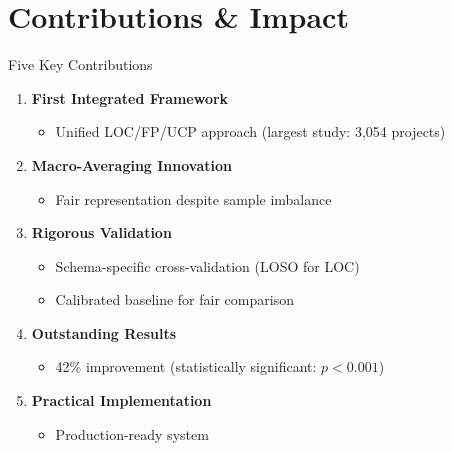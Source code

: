 \documentclass[aspectratio=169]{beamer}
\begin{document}
\section{Contributions \& Impact}

\begin{frame}{Five Key Contributions}
\begin{enumerate}
    \item \textbf{First Integrated Framework}
    \begin{itemize}
        \item Unified LOC/FP/UCP approach (largest study: 3,054 projects)
    \end{itemize}
    
    \vspace{0.2cm}
    \item \textbf{Macro-Averaging Innovation}
    \begin{itemize}
        \item Fair representation despite sample imbalance
    \end{itemize}
    
    \vspace{0.2cm}
    \item \textbf{Rigorous Validation}
    \begin{itemize}
        \item Schema-specific cross-validation (LOSO for LOC)
        \item Calibrated baseline for fair comparison
    \end{itemize}
    
    \vspace{0.2cm}
    \item \textbf{Outstanding Results}
    \begin{itemize}
        \item 42\% improvement (statistically significant: $p < 0.001$)
    \end{itemize}
    
    \vspace{0.2cm}
    \item \textbf{Practical Implementation}
    \begin{itemize}
        \item Production-ready system
    \end{itemize}
\end{enumerate}
\end{frame}
\end{document}
